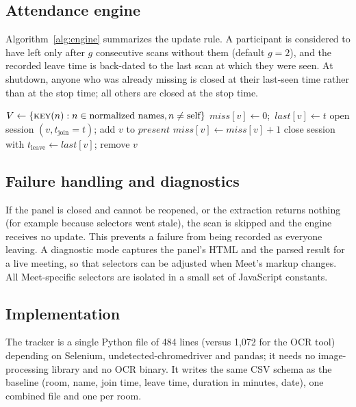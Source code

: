 \documentclass[conference]{IEEEtran}
\begin{document}
\subsection{Attendance engine}
Algorithm~\ref{alg:engine} summarizes the update rule. A participant is considered to have left only after $g$ consecutive scans without them (default $g=2$), and the recorded leave time is back-dated to the last scan at which they were seen. At shutdown, anyone who was already missing is closed at their last-seen time rather than at the stop time; all others are closed at the stop time.

\begin{algorithm}[t]
\caption{Engine update for one room and scan at time $t$}\label{alg:engine}
\begin{algorithmic}[1]
\STATE $V \leftarrow \{\textsc{key}(n) : n\in \text{normalized names}, n\ne\text{self}\}$
  \STATE $miss[v]\leftarrow 0$;\ $last[v]\leftarrow t$
   \STATE open session $(v, t_{\text{join}}{=}t)$; add $v$ to $present$ \ENDIF
\ENDFOR
{}
  \STATE $miss[v]\leftarrow miss[v]+1$
   \STATE close session with $t_{\text{leave}}\leftarrow last[v]$; remove $v$ \ENDIF
\ENDFOR
\end{algorithmic}
\end{algorithm}

\subsection{Failure handling and diagnostics}
If the panel is closed and cannot be reopened, or the extraction returns nothing (for example because selectors went stale), the scan is skipped and the engine receives no update. This prevents a failure from being recorded as everyone leaving. A diagnostic mode captures the panel's HTML and the parsed result for a live meeting, so that selectors can be adjusted when Meet's markup changes. All Meet-specific selectors are isolated in a small set of JavaScript constants.

\subsection{Implementation}
The tracker is a single Python file of 484 lines (versus 1{,}072 for the OCR tool) depending on Selenium, undetected-chromedriver and pandas; it needs no image-processing library and no OCR binary. It writes the same CSV schema as the baseline (room, name, join time, leave time, duration in minutes, date), one combined file and one per room.
\end{document}
